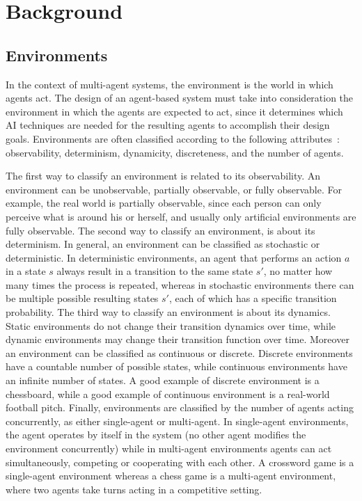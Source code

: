 \section{Background}
\label{sec:background}



\subsection{Environments}
\label{subsec:environments}

In the context of multi-agent systems, the environment is the world in which agents act.
The design of an agent-based system must take into consideration the environment in which the agents are expected to act, since it determines which AI techniques are needed for the resulting agents to accomplish their design goals. 
Environments are often classified according to the following attributes~\cite{russell1995artificial}:  observability, determinism, dynamicity, discreteness, and the number of agents. 

The first way to classify an environment is related to its observability. 
An environment can be unobservable, partially observable, or fully observable. 
For example, the real world is partially observable, since each person can only perceive what is around his or herself, and usually only artificial environments are fully observable.
% 
The second way to classify an environment, is about its determinism.
In general, an environment can be classified as stochastic or deterministic.
In deterministic environments, an agent that performs an action $a$ in a state $s$ always result in a transition to the same state $s'$, no matter how many times the process is repeated, whereas in stochastic environments there can be multiple possible resulting states $s'$, each of which has a specific transition probability.
% 
The third way to classify an environment is about its dynamics. 
Static environments do not change their transition dynamics over time, while dynamic environments may change their transition function over time. 
% 
Moreover an environment can be classified as continuous or discrete.
Discrete environments have a countable number of possible states, while continuous environments have an infinite number of states.
A good example of discrete environment is a chessboard, while a good example of continuous environment is a real-world football pitch. 
% 
Finally, environments are classified by the number of agents acting concurrently, as either single-agent or multi-agent. 
In single-agent environments, the agent operates by itself in the system (no other agent modifies the environment concurrently) while in multi-agent environments agents can act simultaneously, competing or cooperating with each other. 
A crossword game is a single-agent environment whereas a chess game is a multi-agent environment, where  two agents take turns acting in a competitive setting.



